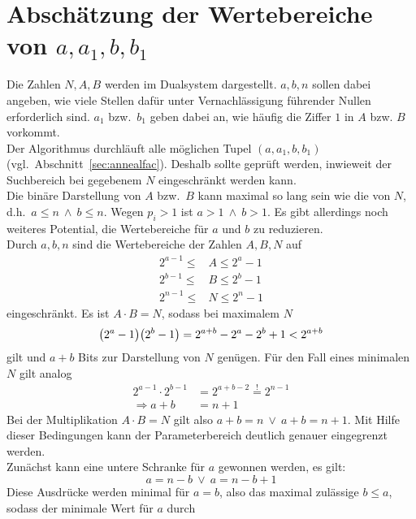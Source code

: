 \section{\texorpdfstring{Abschätzung der Wertebereiche von $a,a_1,b,b_1$}{Abschätzung der Wertebereiche von a, a1, b, b1}}\label{sec:parameterspace}
Die Zahlen $N,A,B$ werden im Dualsystem dargestellt. $a,b,n$ sollen dabei angeben, wie viele Stellen dafür unter Vernachlässigung führender Nullen erforderlich sind. $a_1$ bzw.\ $b_1$ geben dabei an, wie häufig die Ziffer $1$ in $A$ bzw. $B$ vorkommt. \\
Der Algorithmus durchläuft alle möglichen Tupel $\left(a,a_1,b,b_1\right)$ (vgl.\ Abschnitt~\ref{sec:annealfac}). Deshalb sollte geprüft werden, inwieweit der Suchbereich bei gegebenem $N$ eingeschränkt werden kann. \\
Die binäre Darstellung von $A$ bzw.\ $B$ kann maximal so lang sein wie die von $N$, d.h.\ $a\leq n\:\wedge\: b\leq n$. Wegen $p_i > 1$ ist $a>1\:\wedge\:b>1$. Es gibt allerdings noch weiteres Potential, die Wertebereiche für $a$ und $b$ zu reduzieren. \\
Durch $a,b,n$ sind die Wertebereiche der Zahlen $A,B,N$ auf
\begin{align*}
		2^{a-1}\leq &A \leq 2^a-1 \\
		2^{b-1}\leq &B \leq 2^b-1 \\
		2^{n-1}\leq &N \leq 2^n-1
\end{align*}
eingeschränkt. Es ist $A\cdot B=N$, sodass bei maximalem $N$
\begin{equation*}
		\big(2^a-1\big)\big(2^b-1\big)=2^{a+b}-2^a-2^b+1<2^{a+b} \\
\end{equation*}
gilt und $a+b$ Bits zur Darstellung von $N$ genügen. Für den Fall eines minimalen $N$ gilt analog
\begin{align*}
		2^{a-1}\cdot 2^{b-1}&=2^{a+b-2}\overset{!}{=}2^{n-1} \\
		\Rightarrow a+b&=n+1
\end{align*}
Bei der Multiplikation $A\cdot B =N$ gilt also $a+b=n\:\vee\:a+b=n+1$. Mit Hilfe dieser Bedingungen kann der Parameterbereich deutlich genauer eingegrenzt werden. \\
Zunächst kann eine untere Schranke für $a$ gewonnen werden, es gilt:
\begin{equation*}
		a=n-b \:\vee\: a=n-b+1
\end{equation*}
Diese Ausdrücke werden minimal für $a=b$, also das maximal zulässige $b \leq a$, sodass der minimale Wert für $a$ durch
